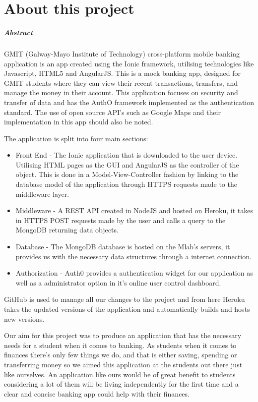 
\chapter*{About this project}
\paragraph{Abstract}
GMIT (Galway-Mayo Institute of Technology) cross-platform mobile banking application is an app created using the Ionic framework, utilising technologies like Javascript, HTML5 and AngularJS. This is a mock banking app, designed for GMIT students where they can view their recent transactions, transfers, and manage the money in their account. This application focuses on security and transfer of data and has the AuthO framework implemented as the authentication standard. The use of open source API's such as Google Maps and their implementation in this app should also be noted.

The application is split into four main sections:

\begin{itemize}
    \item Front End - The Ionic application that is downloaded to the user device. Utilising HTML pages as the GUI and AngularJS as the controller of the object. This is done in a Model-View-Controller fashion by linking to the database model of the application through HTTPS requests made to the middleware layer.
    \item Middleware - A REST API created in NodeJS and hosted on Heroku, it takes in HTTPS POST requests made by the user and calls a query to the MongoDB returning  data objects.
    \item Database - The MongoDB database is hosted on the Mlab's servers, it provides us with the necessary data structures through a internet connection.
    \item Authorization - Auth0 provides a authentication widget for our application as well as a administrator option in it's online user control dashboard.
\end{itemize}

 GitHub is used to manage all our changes to the project and from here Heroku takes the updated versions of the application and automatically builds and hosts new versions.

Our aim for this project was to produce an application that has the necessary needs for a student when it comes to banking. As students when it comes to finances there's only few things we do, and that is either saving, spending or transferring money so we aimed this application at the students out there just like ourselves. An application like ours would be of great benefit to students considering a lot of them will be  living independently for the first time and a clear and concise banking app could help with their finances.





